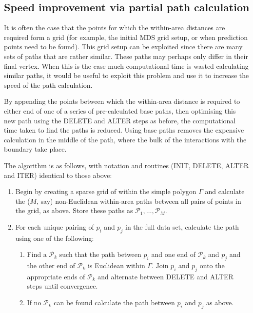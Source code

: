 \documentclass[useAMS, referee]{biom}
\begin{document}
\subsection*{Speed improvement via partial path calculation}

It is often the case that the points for which the within-area distances are required form a grid (for example, the initial MDS grid setup, or when prediction points need to be found). This grid setup can be exploited since there are many sets of paths that are rather similar. These paths may perhaps only differ in their final vertex. When this is the case much computational time is wasted calculating similar paths, it would be useful to exploit this problem and use it to increase the speed of the path calculation.

By appending the points between which the within-area distance is required to either end of one of a series of pre-calculated base paths, then optimising this new path using the DELETE and ALTER steps as before,  the computational time taken to find the paths is reduced. Using base paths removes the expensive calculation in the middle of the path, where the bulk of the interactions with the boundary take place.

The algorithm is as follows, with notation and routines (INIT, DELETE, ALTER and ITER) identical to those above:
\begin{enumerate}
 \item Begin by creating a sparse grid of within the simple polygon $\Gamma$ and calculate the ($M$, say) non-Euclidean within-area paths between all pairs of points in the grid, as above. Store these paths as $\mathcal{P}_1,\ldots, \mathcal{P}_M$.
\item For each unique pairing of $p_i$ and $p_j$ in the full data set, calculate the path using one of the following:
	\begin{enumerate}
	\item Find a $\mathcal{P}_k$ such that the path between $p_i$ and one end of $\mathcal{P}_k$ and $p_j$ and the other end of $\mathcal{P}_k$ is Euclidean within $\Gamma$. Join $p_i$ and $p_j$ onto the appropriate ends of $\mathcal{P}_k$ and alternate between DELETE and ALTER steps until convergence.
	\item If no $\mathcal{P}_k$ can be found calculate the path between $p_i$ and $p_j$ as above. 
	\end{enumerate}
\end{enumerate}
\end{document}
